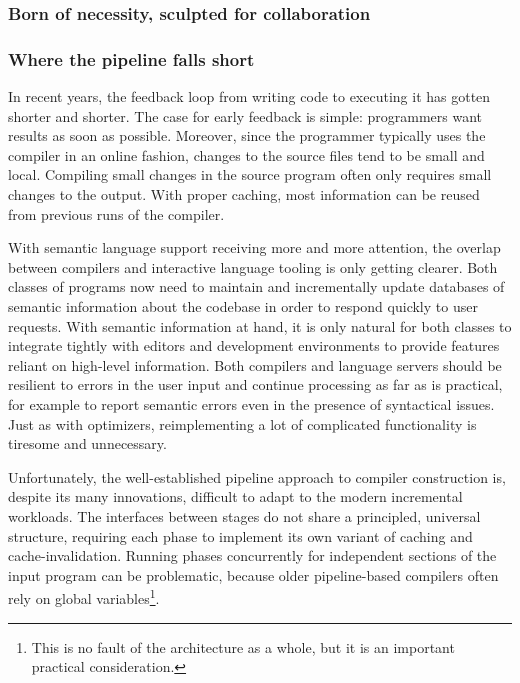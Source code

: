 \subsubsection*{Born of necessity, sculpted for collaboration}


\subsubsection*{Where the pipeline falls short}

In recent years, the feedback loop from writing code to executing it has gotten
shorter and shorter. The case for early feedback is simple: programmers want
results as soon as possible. Moreover, since the programmer typically uses the
compiler in an online fashion, changes to the source files tend to be small and
local. Compiling small changes in the source program often only requires small
changes to the output. With proper caching, most information can be reused from
previous runs of the compiler.

With semantic language support receiving more and more attention, the overlap
between compilers and interactive language tooling is only getting clearer. Both
classes of programs now need to maintain and incrementally update databases of
semantic information about the codebase in order to respond quickly to user
requests. With semantic information at hand, it is only natural for both classes
to integrate tightly with editors and development environments to provide
features reliant on high-level information. Both compilers and language servers
should be resilient to errors in the user input and continue processing as far
as is practical, for example to report semantic errors even in the presence of
syntactical issues. Just as with optimizers, reimplementing a lot of complicated
functionality is tiresome and unnecessary.

Unfortunately, the well-established pipeline approach to compiler construction
is, despite its many innovations, difficult to adapt to the modern incremental
workloads. The interfaces between stages do not share a principled, universal
structure, requiring each phase to implement its own variant of caching and
cache-invalidation. Running phases concurrently for independent sections of the
input program can be problematic, because older pipeline-based compilers often
rely on global variables\footnote{This is no fault of the architecture as a
whole, but it is an important practical consideration.}.

